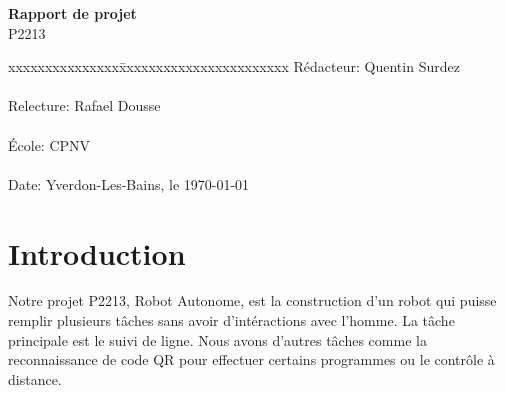 \documentclass[
	a4paper,									%
	11pt,										%
	twoside,									%
	openright,									%
	notitlepage,									%
	parskip=half,								%
]{scrreprt}										%
\begin{document}
\begin{titlepage}
	\vspace{3cm}

	\fontsize{30pt}{32pt}\selectfont 
	\noindent \textbf{Rapport de projet} \\

	\fontsize{18pt}{20pt}\selectfont\vspace{0.3em} P2213 \\

	\vspace{4cm}
	\fontsize{12pt}{15pt}\selectfont
	\begin{tabbing}
		xxxxxxxxxxxxxxx\=xxxxxxxxxxxxxxxxxxxxxxx \kill
		Rédacteur:\> Quentin Surdez\\ \\
		Relecture:\> Rafael Dousse\\ \\
		École:\> CPNV\\ \\
		Date:\> Yverdon-Les-Bains, le \today \\
	\end{tabbing}
\end{titlepage}

\tableofcontents

\listoffigures									%
\listoftables									%
\cleardoublepage

\setcounter{page}{1}

\chapter{Introduction}

Notre projet P2213, Robot Autonome, est la construction d'un robot qui puisse remplir plusieurs tâches
sans avoir d'intéractions avec l'homme. La tâche principale est le suivi de ligne. Nous avons d'autres 
tâches comme la reconnaissance de code QR pour effectuer certains programmes ou le contrôle à distance. \par
\end{document}
